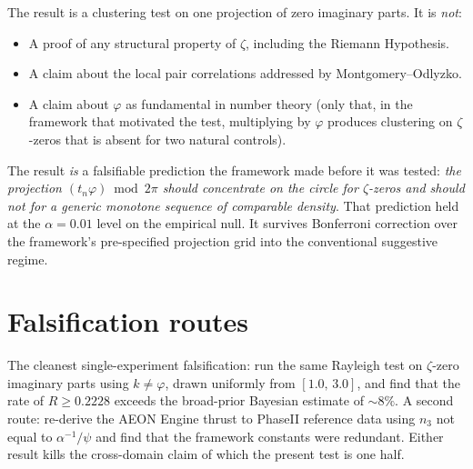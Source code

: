 \documentclass[11pt,a4paper]{article}
\begin{document}
The result is a clustering test on one projection of zero imaginary parts.
It is \emph{not}:
\begin{itemize}
  \item A proof of any structural property of $\zeta$, including the Riemann Hypothesis.
  \item A claim about the local pair correlations addressed by Montgomery--Odlyzko.
  \item A claim about $\varphi$ as fundamental in number theory (only that, in the framework that motivated the test, multiplying by $\varphi$ produces clustering on $\zeta$-zeros that is absent for two natural controls).
\end{itemize}

The result \emph{is} a falsifiable prediction the framework made before it
was tested: \emph{the projection $(t_n \varphi) \bmod 2\pi$ should
concentrate on the circle for $\zeta$-zeros and should not for a generic
monotone sequence of comparable density}. That prediction held at the
$\alpha = 0.01$ level on the empirical null. It survives Bonferroni
correction over the framework's pre-specified projection grid into
the conventional suggestive regime.

\section{Falsification routes}

The cleanest single-experiment falsification: run the same Rayleigh test on
$\zeta$-zero imaginary parts using $k \ne \varphi$, drawn uniformly
from $[1.0,\,3.0]$, and find that the rate of $R \ge 0.2228$ exceeds
the broad-prior Bayesian estimate of $\sim 8\%$. A second route:
re-derive the AEON Engine thrust to PhaseII reference data using $n_3$
not equal to $\alpha^{-1}/\psi$ and find that the framework constants
were redundant. Either result kills the cross-domain claim of which the
present test is one half.
\end{document}
